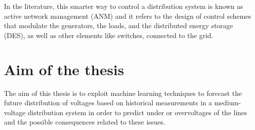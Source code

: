 In the literature, this smarter way to control a distribution system is known as active network management (\gls{ANM}) and it refers to the design of control schemes that modulate the generators, the loads, and the distributed energy storage (\gls{DES}), as well as other elements like switches, connected to the grid. \\


\section{Aim of the thesis}
\label{sec:aimthesis}
The aim of this thesis is to exploit machine learning techniques to forecast the future distribution of voltages based on historical measurements in a medium-voltage distribution system in order to predict under or overvoltages of the lines and the possible consequences related to these issues. 



